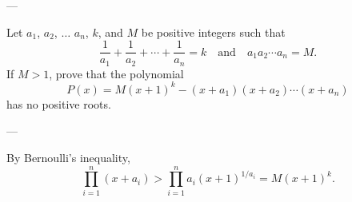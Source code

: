 
---

Let $a_1$, $a_2$, $\ldots$ $a_n$, $k$, and $M$ be positive integers such that
\[\frac1{a_1}+\frac1{a_2}+\cdots+\frac1{a_n}=k\quad\text{and}\quad a_1a_2\cdots a_n=M.\]
If $M>1$, prove that the polynomial
\[P(x)=M(x+1)^k-(x+a_1)(x+a_2)\cdots(x+a_n)\]
has no positive roots.

---

By Bernoulli's inequality,
\[\prod_{i=1}^n(x+a_i)>\prod_{i=1}^na_i(x+1)^{1/a_i}=M(x+1)^k.\]

